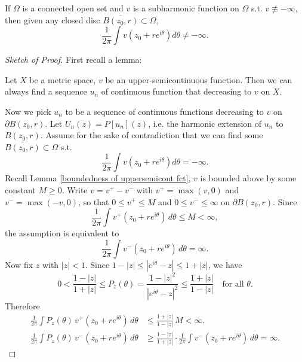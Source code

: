 \begin{corollary}
If $\Omega$ is a connected open set and $v$ is a subharmonic function on $\Omega$ s.t. $v\not\equiv -\infty$,
then given any closed disc $\overline{B(z_0,r)}\subset \Omega$, 
\begin{equation*}
    \frac{1}{2\pi}\int v(z_0+r e^{i\theta})d\theta \neq -\infty.
\end{equation*}
\end{corollary}
\begin{proof}[Sketch of Proof]
First recall a lemma:
\begin{lemma}
Let $X$ be a metric space, $v$ be an upper-semicontinuous function. Then we can always find
a sequence $u_n$ of continuous function that decreasing to $v$ on $X$.
\end{lemma}
Now we pick $u_n$ to be a sequence of continuous functions decreasing to $v$ on 
$\partial B(z_0,r)$. Let $U_n(z)=P[u_n](z)$, i.e. the harmonic extension of $u_n$ to $B(z_0,r)$.
Assume for the sake of contradiction that we can find some $\overline{B(z_0,r)}\subset\Omega$ s.t.
\begin{equation*}
  \frac{1}{2\pi}\int v(z_0+r e^{i\theta})d\theta = -\infty.
\end{equation*}
Recall Lemma \ref{boundedness of uppersemicont fct}, $v$ is bounded above by some
constant $M\geq 0$. Write $v=v^+-v^-$ with $v^+=\max(v,0)$ and $v^-=\max(-v,0)$, so that
$0\leq v^+\leq M$ and $0\leq v^-\leq\infty$ on $\partial B(z_0,r)$. Since
\begin{equation*}
  \frac{1}{2\pi}\int v^+(z_0+re^{i\theta})\, d\theta\leq M<\infty,
\end{equation*}
the assumption is equivalent to
\begin{equation*}
  \frac{1}{2\pi}\int v^-(z_0+re^{i\theta})\, d\theta=\infty.
\end{equation*}
Now fix $z$ with $|z|<1$. Since $1-|z|\leq |e^{i\theta}-z|\leq 1+|z|$, we have
\begin{equation*}
  0<\frac{1-|z|}{1+|z|}\leq P_z(\theta)=\frac{1-|z|^2}{|e^{i\theta}-z|^2}\leq\frac{1+|z|}{1-|z|}
  \quad\text{for all }\theta.
\end{equation*}
Therefore
\begin{align*}
  \frac{1}{2\pi}\int P_z(\theta)\, v^+(z_0+re^{i\theta})\, d\theta
  &\leq \frac{1+|z|}{1-|z|}\, M<\infty,\\
  \frac{1}{2\pi}\int P_z(\theta)\, v^-(z_0+re^{i\theta})\, d\theta
  &\geq \frac{1-|z|}{1+|z|}\cdot\frac{1}{2\pi}\int v^-(z_0+re^{i\theta})\, d\theta=\infty.

\end{align*}
\end{proof}
